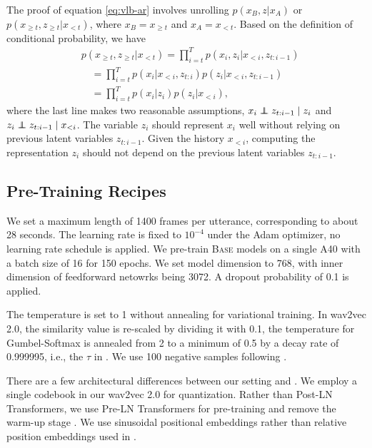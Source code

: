 The proof of equation \ref{eq:vlb-ar} involves unrolling $p(x_B, z | x_A)$ or $p(x_{\geq t}, z_{\geq t} | x_{< t})$, where $x_B = x_{\geq t}$ and $x_A = x_{< t}$.
Based on the definition of conditional probability, we have
\begin{align}
&p(x_{\geq t}, z_{\geq t} | x_{< t}) = \prod_{i=t}^T p(x_i, z_i | x_{< i}, z_{t:i-1}) \\
&\quad = \prod_{i=t}^T p(x_i | x_{< i}, z_{t:i}) p(z_i | x_{< i}, z_{t:i-1}) \\
&\quad = \prod_{i=t}^T p(x_i | z_i) p(z_i | x_{< i}),
\end{align}
where the last line makes two reasonable assumptions, $x_i \perp\!\!\!\!\perp z_{t:i-1} \mid z_i$ and $z_i \perp\!\!\!\!\perp z_{t:i-1} \mid x_{< i}$.
The variable $z_i$ should represent $x_i$ well without relying on previous latent variables $z_{t:i-1}$.
Given the history $x_{< i}$, computing the representation $z_i$ should not depend on the previous latent variables $z_{t:i-1}$.

%
%

%
%
%
%
%
%
%

%

%
%
%
%
%
%
%
%
%
%
%
%
%

%
%
%
%

\subsection{Pre-Training Recipes}
\label{appendix:recipe}

%
%
%
%
We set a maximum length of 1400 frames per utterance, 
corresponding to about 28 seconds. The learning rate is fixed to $10^{-4}$ under the Adam optimizer,
no learning rate schedule is applied.
We pre-train
\textsc{Base} models on a single A40 with a batch size of 16 for 150 epochs. 
We set model dimension to 768, with inner dimension of feedforward netowrks being 3072.
A dropout probability of 0.1 is applied.

The temperature is set to 1 without annealing for variational training.
In wav2vec 2.0, the similarity value is re-scaled by dividing it with 0.1, 
the temperature for Gumbel-Softmax \citep{jang2016categorical} is annealed from 2 to a minimum of 0.5 by a decay rate of 0.999995,
i.e., the $\tau$ in .
We use 100 negative samples following \citet{baevski2020wav2vec}.

There are a few architectural differences between our setting and \citet{baevski2020wav2vec}.
%
%
We employ a single codebook in our wav2vec 2.0 for quantization.
%
%
%
Rather than Post-LN Transformers, 
we use Pre-LN Transformers for pre-training
and remove the warm-up stage \citep{geiping2023cramming,xiong2020layer}.
We use sinusoidal positional embeddings rather than relative position embeddings used in 
\citet{baevski2020wav2vec}.

